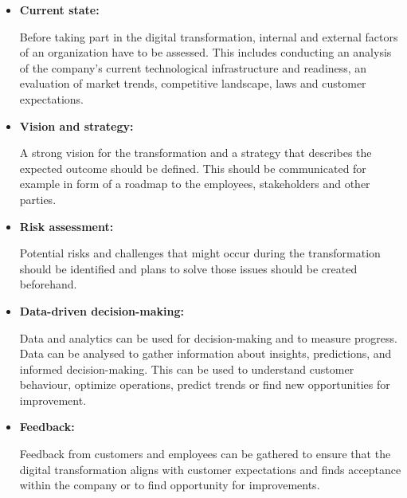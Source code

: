\documentclass[a4]{scrartcl}
\begin{document}
\begin{itemize}
	
	
\item \textbf{Current state:}

Before taking part in the digital transformation, internal and external factors of an organization have to be assessed. This includes conducting an analysis of the company's current technological infrastructure and readiness, an evaluation of market trends, competitive landscape, laws and customer expectations. \cite{air, tips2}



\item \textbf{Vision and strategy:} 

A strong vision for the transformation and a strategy that describes the expected outcome should be defined. This should be communicated for example in form of a roadmap to the employees, stakeholders and other parties.~\cite{tips2, digitalmatrix, leadingdigital}




\item \textbf{Risk assessment:} 

Potential risks and challenges that might occur during the transformation should be identified and plans to solve those issues should be created beforehand. \cite{tips2, tips1}

	
\item \textbf{Data-driven decision-making:} 

Data and analytics can be used for decision-making and to measure progress. Data can be analysed to gather information about insights, predictions, and informed decision-making. This can be used to understand customer behaviour, optimize operations, predict trends or find new opportunities for improvement.~\cite{DDDM, masterthesis}


\item \textbf{Feedback:} 

Feedback from customers and employees can be gathered to ensure that the digital transformation aligns with customer expectations and finds acceptance within the company or to find opportunity for improvements. \cite{tips2}
	
	
	

\end{itemize}
\end{document}
